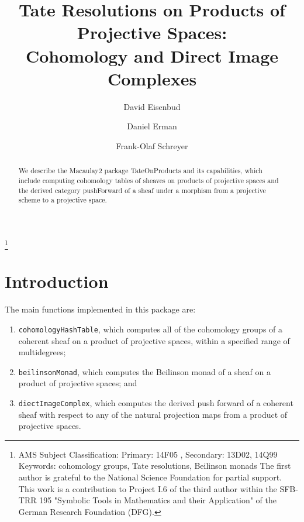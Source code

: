 \documentclass[twoside,12pt, leqno]{amsart}
\author[David Eisenbud]{David Eisenbud}
\author{Daniel Erman}
\author[Frank-Olaf Schreyer]{Frank-Olaf Schreyer}
\title[Tate Resolutions on Products of Projective Spaces]{Tate Resolutions on Products of Projective Spaces: \\ Cohomology and Direct Image Complexes}
\begin{document}
\begin{abstract}
We describe the  Macaulay2 package TateOnProducts and its capabilities, which include computing cohomology tables of sheaves
on products of projective spaces and the derived category pushForward of a sheaf under a morphism from a projective scheme to a projective space.
\end{abstract}

\maketitle

\let\thefootnote\relax\footnote{
\noindent AMS Subject Classification:
Primary: 14F05 ,
Secondary: 13D02, 14Q99 \smallbreak
Keywords: cohomology groups, Tate resolutions, Beilinson monads \smallbreak
The first author is grateful to the
National Science Foundation for partial support. This work is a contribution to Project I.6 of the third author within the SFB-TRR 195 "Symbolic Tools in Mathematics and their Application" of the German Research Foundation (DFG).}


\section*{Introduction}
The main functions implemented in this package are:
\begin{enumerate}
	\item  {\tt cohomologyHashTable}, which computes all of the cohomology groups of a coherent sheaf on a product
	of projective spaces, within a specified range of multidegrees;
	\item  {\tt beilinsonMonad}, which computes the Beilinson monad of a sheaf on a product of projective spaces; and
	\item {\tt diectImageComplex}, which computes the derived push forward of a coherent sheaf with respect to any of the natural projection maps from a product of projective spaces.
\end{enumerate}
\end{document}
